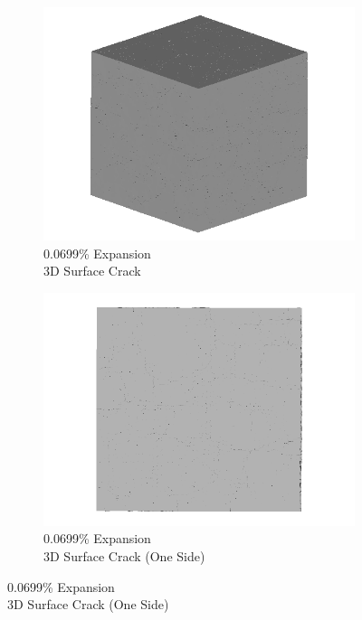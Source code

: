 \begin{figure}[ht!]
\centering
    \begin{subfigure}{.5\textwidth}
      \centering
      \includegraphics[width=0.5\linewidth]{Files/exp_3D/ASR/A30P75_1_3d.png}
      \caption{0.0699\% Expansion\\3D Surface Crack}
    \end{subfigure}%
    \begin{subfigure}{.5\textwidth}
      \centering
      \includegraphics[width=0.5\linewidth]{Files/exp_3D/ASR/A30P75_1_3ds.png}
      \caption{0.0699\% Expansion\\3D Surface Crack (One Side)}
    \end{subfigure}%


\end{figure}
